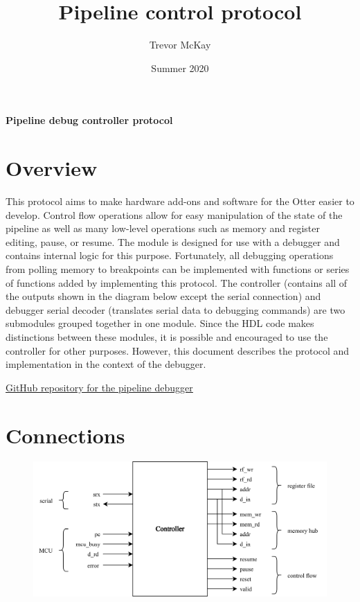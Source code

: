\documentclass[10pt,a4paper]{article}
\title{Pipeline control protocol}
\author{Trevor McKay}
\date{Summer 2020}
\begin{document}
\begin{center}
    \Large\textbf{Pipeline debug controller protocol}
\end{center}

\section{Overview}

This protocol aims to make hardware add-ons and software for the Otter easier to develop. Control flow operations
allow for easy manipulation of the state of the pipeline as well as many low-level operations such
as memory and register editing, pause, or resume. The module is designed for use with a debugger and
contains internal logic for this purpose. Fortunately, all debugging operations from polling memory
to breakpoints can be implemented with functions or series of functions added by implementing this
protocol. The controller (contains all of the outputs shown in the diagram below except the serial
connection) and debugger serial decoder (translates serial data to debugging commands) are two
submodules grouped together in one module. Since the HDL code makes distinctions between these modules,
it is possible and encouraged to use the controller for other purposes. However, this document
describes the protocol and implementation in the context of the debugger.

\medskip
\noindent\underline{\href{https://github.com/trmckay/pipeline-debugger}{GitHub repository for the pipeline debugger}}

\section{Connections}

\begin{figure}[H]
    \includegraphics[width=\textwidth]{pipeline_db}
\end{figure}
\medskip
\end{document}
